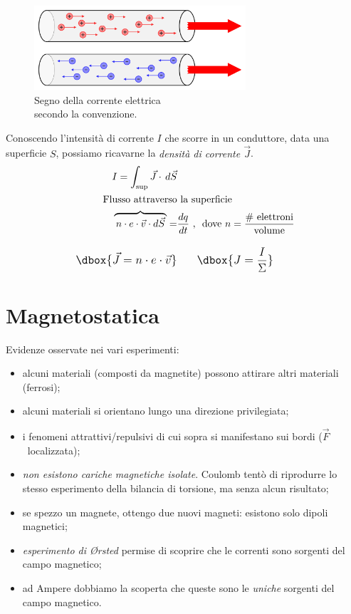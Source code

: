 \documentclass[a4paper,12pt,titlepage,openany]{book}
\theoremstyle{mydef}
\newcommand\dboxed[1]{\mathlarger{\dbox{\ensuremath{#1}}}}  %
\begin{document}
            \begin{figure}
                \centering
                \includegraphics[width=0.7\textwidth]{corrente_elettrica}
                \captionsetup{format=plain, justification=raggedright,labelsep=newline}
                \caption{Segno della corrente elettrica\\ secondo la convenzione.}
            \end{figure}
            
            \noindent
            Conoscendo l'intensità di corrente $I$ che scorre in un conduttore, data una superficie $S$, possiamo ricavarne
            la \emph{densità di corrente $\vec{J}$}.
            \begin{align}
                I = \int_{\sup}\vec{J}\cdot\,d\vec{S}& \notag\\
                \text{Flusso attraverso} & \text{ la superficie} \notag\\
                \overbrace{\,n\cdot e\cdot\vec{v}\cdot d\vec{S}\,} = &\frac{dq}{dt} \text{\ ,\ \ dove }
                n =\frac{\text{\# elettroni}}{\text{volume}} \notag\\[1em]
                \dboxed{\vec{J} = n\cdot e\cdot\vec{v}} & \qquad \dboxed{J = \frac{I}{\Sigma}}
            \end{align}

    \chapter{Magnetostatica}
        Evidenze osservate nei vari esperimenti:
        \begin{itemize}
            \item alcuni materiali (composti da magnetite) possono attirare altri materiali (ferrosi);
            \item alcuni materiali si orientano lungo una direzione privilegiata;
            \item i fenomeni attrattivi/repulsivi di cui sopra si manifestano sui bordi ($\vec{F}$~localizzata);
            \item \emph{non esistono cariche magnetiche isolate}. Coulomb tentò di riprodurre lo stesso esperimento
                della bilancia di torsione, ma senza alcun risultato;
            \item se spezzo un magnete, ottengo due nuovi magneti: esistono solo dipoli magnetici;
            \item \emph{esperimento di \O{}rsted} permise di scoprire che le correnti sono sorgenti del campo magnetico;
            \item ad Ampere dobbiamo la scoperta che queste sono le \emph{uniche} sorgenti del campo magnetico.
        \end{itemize}
    
\end{document}
